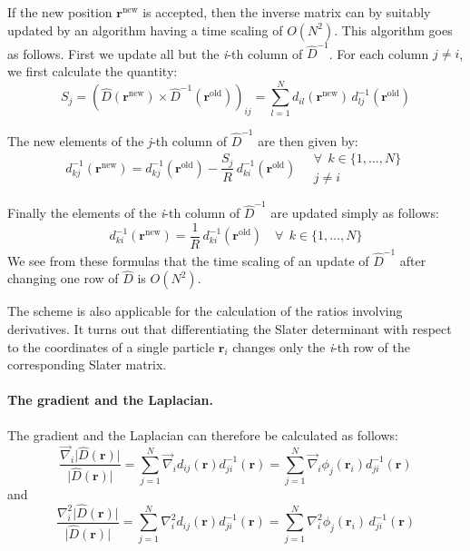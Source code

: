 If the new position $\mathbf{r}^{\mathrm{new}}$ is accepted, then the
inverse matrix can by suitably updated by an algorithm having a time
scaling of $O(N^2)$.  This algorithm goes as
follows. First we update all but the \emph{i}-th column of $\hat{D}^{-1}$. For each column $j\neq i$, we first calculate the quantity:
\begin{equation}
S_j =
(\hat{D}(\mathbf{r}^{\mathrm{new}})\times
\hat{D}^{-1}(\mathbf{r}^{\mathrm{old}}))_{ij} =
\sum_{l=1}^N d_{il}(\mathbf{r}^{\mathrm{new}})\,
d^{-1}_{lj}(\mathbf{r}^{\mathrm{old}})
\label{eq:inverse_update_1}
\end{equation}

The new elements of the \emph{j}-th column of $\hat{D}^{-1}$ are then given
by:
\begin{equation}
d_{kj}^{-1}(\mathbf{r}^{\mathrm{new}}) =
d_{kj}^{-1}(\mathbf{r}^{\mathrm{old}}) -
\frac{S_j}{R}\,d_{ki}^{-1}(\mathbf{r}^{\mathrm{old}})\quad
\begin{array}{ll}
\forall\ \ k\in\{1,\dots,N\}\\j\neq i
\end{array}
\label{eq:inverse_update_2}
\end{equation}

Finally the elements of the \emph{i}-th column of $\hat{D}^{-1}$ are updated
simply as follows:
\begin{equation}
d_{ki}^{-1}(\mathbf{r}^{\mathrm{new}}) =
\frac{1}{R}\,d_{ki}^{-1}(\mathbf{r}^{\mathrm{old}})\quad
\forall\ \ k\in\{1,\dots,N\}
\label{eq:inverse_update_3}
\end{equation}
We see from these formulas that the time scaling of an update of
$\hat{D}^{-1}$ after changing one row of $\hat{D}$ is $O(N^2)$.

The scheme is also applicable for the calculation of the ratios
involving derivatives. It turns
out that differentiating the Slater determinant with respect
to the coordinates of a single particle  $\mathbf{r}_i$ changes only the
\emph{i}-th row of the corresponding Slater matrix. 

\paragraph{The gradient and the Laplacian.}
The gradient and the Laplacian can therefore be calculated as follows:
\[
\frac{\vec\nabla_i\vert\hat{D}(\mathbf{r})\vert}{\vert\hat{D}(\mathbf{r})\vert} =
\sum_{j=1}^N \vec\nabla_i d_{ij}(\mathbf{r})d_{ji}^{-1}(\mathbf{r}) =
\sum_{j=1}^N \vec\nabla_i \phi_j(\mathbf{r}_i)d_{ji}^{-1}(\mathbf{r})
\]
and
\[
\frac{\nabla^2_i\vert\hat{D}(\mathbf{r})\vert}{\vert\hat{D}(\mathbf{r})\vert} =
\sum_{j=1}^N \nabla^2_i d_{ij}(\mathbf{r})d_{ji}^{-1}(\mathbf{r}) =
\sum_{j=1}^N \nabla^2_i \phi_j(\mathbf{r}_i)\,d_{ji}^{-1}(\mathbf{r})
\]

